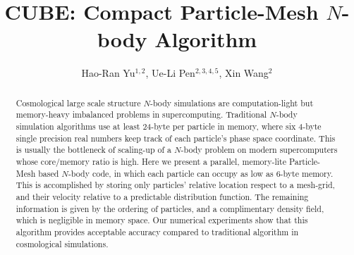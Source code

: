 \documentclass[10pt,twocolumn,preprint]{emulateapj}
\begin{document}
\title{CUBE: Compact Particle-Mesh $N$-body Algorithm}
\author{
Hao-Ran Yu$^{1,2}$,
Ue-Li Pen$^{2,3,4,5}$,
Xin Wang$^{2}$
}



\begin{abstract}
Cosmological large scale structure $N$-body simulations are computation-light but memory-heavy imbalanced problems in supercomputing. Traditional $N$-body simulation algorithms use at least 24-byte per particle in memory, where six 4-byte single precision real numbers keep track of each particle's phase space coordinate. This is usually the bottleneck of scaling-up of a $N$-body problem on modern supercomputers whose core/memory ratio is high. Here we present a parallel, memory-lite Particle-Mesh based $N$-body code, in which each particle can occupy as low as 6-byte memory. This is accomplished by storing only particles' relative location respect to a mesh-grid, and their velocity relative to a predictable distribution function. The remaining information is given by the ordering of particles, and a complimentary density field, which is negligible in memory space. Our numerical experiments show that this algorithm provides acceptable accuracy compared to traditional algorithm in cosmological simulations.

\end{abstract}

\keywords{}

\maketitle
\end{document}
